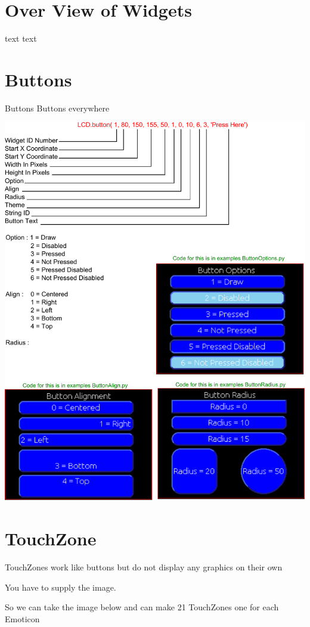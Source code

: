 \hypertarget{d0/d90/intro_widgets_overView}{}\section{Over View of Widgets}\label{d0/d90/intro_widgets_overView}
text text\par
 \hypertarget{d0/d90/intro_widgets_buttons}{}\section{Buttons}\label{d0/d90/intro_widgets_buttons}
Buttons Buttons everywhere\par
 

 
\begin{DoxyImageNoCaption}
  \mbox{\includegraphics{buttons}}
\end{DoxyImageNoCaption}
 \hypertarget{d0/d90/intro_widgets_touchZone}{}\section{Touch\-Zone}\label{d0/d90/intro_widgets_touchZone}
Touch\-Zones work like buttons but do not display any graphics on their own\par
 You have to supply the image.\par
 So we can take the image below and can make 21 Touch\-Zones one for each Emoticon\par
  
